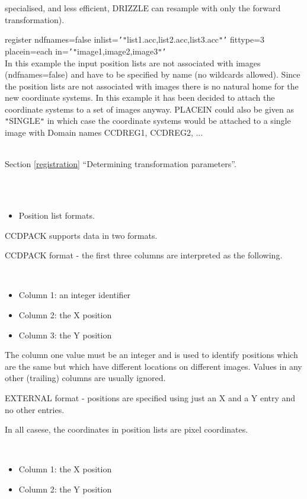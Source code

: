 \documentclass[twoside,11pt]{article}
\newcommand{\htmlref}[2]{#1}
\newcommand{\latexhtml}[2]{#1}
\renewcommand{\_}{\texttt{\symbol{95}}}
\newcommand{\secref}[2]{\latexhtml{Section \ref{#1} ``#2''}{``\htmlref{#2}{#1}''}}
\newcommand{\sstexamplesubsection}[2]{\sloppy \item{\ssttt #1} \mbox{} \\ #2 }
\newcommand{\sstnotes}[1]{\item[Notes:] \mbox{} \\[1.3ex] #1}
\newcommand{\sstdiytopic}[2]{\item[#1:] \mbox{} \\[1.3ex] #2}
\newcommand{\sstitemlist}[1]{
  \mbox{} \\
  \vspace{-3.5ex}
  \begin{itemize}
     #1
  \end{itemize}
}
\newcommand{\sstitem}{\item}
\newcommand{\sstexamplesubsection}[2]{\item[{\ssttt #1}] #2}
\newcommand{\sstnotes}[1]{\item[Notes:] #1 }
\newcommand{\sstdiytopic}[2]{\item[{#1:}] #2 }
\newcommand{\sstitemlist}[1]{
      \begin{itemize}
         #1
      \end{itemize}
      \\
   }
\newcommand{\sstitem}{\item}
\begin{document}
{{{         specialised, and less efficient, DRIZZLE can resample with
         only the forward transformation).
      }
      \sstexamplesubsection{
         register ndfnames=false inlist={\tt '}{\tt "}list1.acc,list2.acc,list3.acc{\tt "}{\tt '}
               fittype=3 placein=each in={\tt '}{\tt "}image1,image2,image3{\tt "}{\tt '}
      }{
         In this example the input position lists are not associated
         with images (ndfnames=false) and have to be specified by name
         (no wildcards allowed). Since the position lists are not
         associated with images there is no natural home for the
         new coordinate systems. In this example it has been decided to
         attach the coordinate systems to a set of images anyway.
         PLACEIN could also be given as {\tt "}SINGLE{\tt "} in which case the
         coordinate systems would be attached to a single image with
         Domain names CCD\_REG\_1, CCD\_REG\_2, ...
      }
   }
   \sstdiytopic{
      See also
   } {
      \secref{registration}{Determining transformation parameters}.
   }
   \sstnotes{
      \sstitemlist{

         \sstitem
         Position list formats.

      }
        CCDPACK supports data in two formats.

        CCDPACK format - the first three columns are interpreted as the
        following.

      \sstitemlist{

         \sstitem
              Column 1: an integer identifier

         \sstitem
              Column 2: the X position

         \sstitem
              Column 3: the Y position

      }
        The column one value must be an integer and is used to identify
        positions which are the same but which have different locations
        on different images. Values in any other (trailing) columns are
        usually ignored.

        EXTERNAL format - positions are specified using just an X and
        a Y entry and no other entries.

        In all casese, the coordinates in position lists are pixel
        coordinates.

      \sstitemlist{

         \sstitem
              Column 1: the X position

         \sstitem
              Column 2: the Y position

}}}
\end{document}
